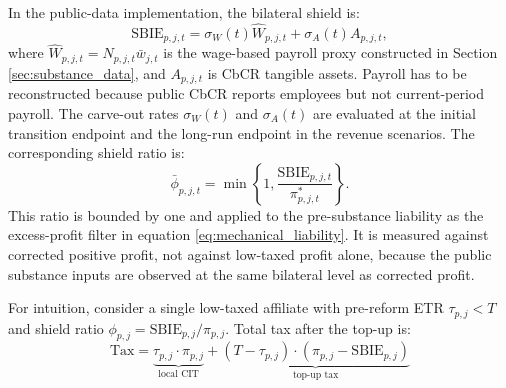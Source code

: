 \documentclass[11pt,a4paper]{article}
\begin{document}
In the public-data implementation, the bilateral shield is:
\begin{equation}\label{eq:sbie}
\text{SBIE}_{p,j,t}=\sigma_W(t)\hat{W}_{p,j,t}+\sigma_A(t)A_{p,j,t},
\end{equation}
where $\hat{W}_{p,j,t}=N_{p,j,t}\bar{w}_{j,t}$ is the wage-based payroll proxy constructed in Section \ref{sec:substance_data}, and $A_{p,j,t}$ is CbCR tangible assets. Payroll has to be reconstructed because public CbCR reports employees but not current-period payroll. The carve-out rates $\sigma_W(t)$ and $\sigma_A(t)$ are evaluated at the initial transition endpoint and the long-run endpoint in the revenue scenarios. The corresponding shield ratio is:
\begin{equation}\label{eq:sbie_ratio}
\bar{\phi}_{p,j,t}=\min\!\left\{1,\frac{\text{SBIE}_{p,j,t}}{\pi^{*}_{p,j,t}}\right\}.
\end{equation}
This ratio is bounded by one and applied to the pre-substance liability as the excess-profit filter in equation \eqref{eq:mechanical_liability}. It is measured against corrected positive profit, not against low-taxed profit alone, because the public substance inputs are observed at the same bilateral level as corrected profit. 

For intuition, consider a single low-taxed affiliate with pre-reform ETR $\tau_{p,j}<T$ and shield ratio $\phi_{p,j}=\text{SBIE}_{p,j}/\pi_{p,j}$. Total tax after the top-up is:
\begin{equation}\label{eq:total_tax}
\text{Tax} = \underbrace{\tau_{p,j} \cdot \pi_{p,j}}_{\text{local CIT}} + \underbrace{(T - \tau_{p,j}) \cdot (\pi_{p,j} - \text{SBIE}_{p,j})}_{\text{top-up tax}}
\end{equation}
\end{document}
